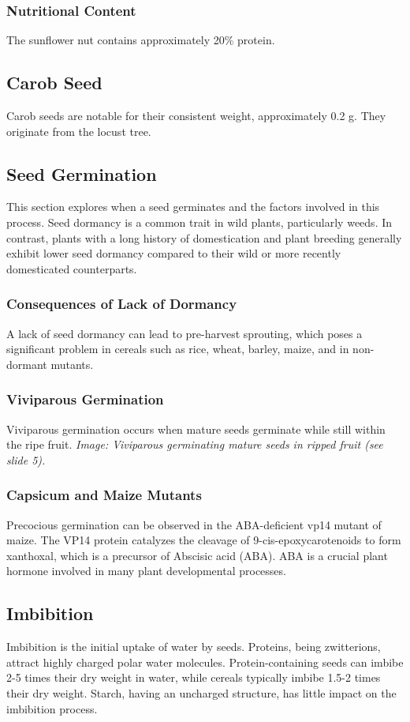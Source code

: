 \subsubsection*{Nutritional Content} 
The sunflower nut contains approximately 20\% protein.

\subsection{Carob Seed} 
Carob seeds are notable for their consistent weight, approximately 0.2 g. They originate from the locust tree.

\subsection{Seed Germination} 
This section explores when a seed germinates and the factors involved in this process. Seed dormancy is a common trait in wild plants, particularly weeds. In contrast, plants with a long history of domestication and plant breeding generally exhibit lower seed dormancy compared to their wild or more recently domesticated counterparts.

\subsubsection*{Consequences of Lack of Dormancy} 
A lack of seed dormancy can lead to pre-harvest sprouting, which poses a significant problem in cereals such as rice, wheat, barley, maize, and in non-dormant mutants.

\subsubsection*{Viviparous Germination} 
Viviparous germination occurs when mature seeds germinate while still within the ripe fruit. \textit{Image: Viviparous germinating mature seeds in ripped fruit (see slide 5).}

\subsubsection*{Capsicum and Maize Mutants} 
Precocious germination can be observed in the ABA-deficient vp14 mutant of maize. The VP14 protein catalyzes the cleavage of 9-cis-epoxycarotenoids to form xanthoxal, which is a precursor of Abscisic acid (ABA). ABA is a crucial plant hormone involved in many plant developmental processes.

\subsection{Imbibition} 
Imbibition is the initial uptake of water by seeds. Proteins, being zwitterions, attract highly charged polar water molecules. Protein-containing seeds can imbibe 2-5 times their dry weight in water, while cereals typically imbibe 1.5-2 times their dry weight. Starch, having an uncharged structure, has little impact on the imbibition process.

